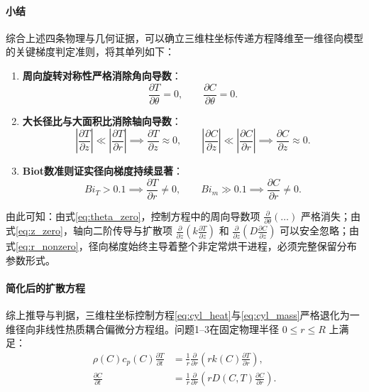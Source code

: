 \documentclass[12pt,a4paper]{ctexart}
\begin{document}
\paragraph{小结}
综合上述四条物理与几何证据，可以确立三维柱坐标传递方程降维至一维径向模型的关键梯度判定准则，将其单列如下：
\begin{enumerate}[label=(\arabic*)]
  \item \textbf{周向旋转对称性严格消除角向导数}：
  \begin{equation}
  \frac{\partial T}{\partial\theta} = 0,\qquad \frac{\partial C}{\partial\theta} = 0.\label{eq:theta_zero}
  \end{equation}
  \item \textbf{大长径比与大面积比消除轴向导数}：
  \begin{equation}
  \left|\frac{\partial T}{\partial z}\right|\ll\left|\frac{\partial T}{\partial r}\right| \implies \frac{\partial T}{\partial z} \approx 0,\qquad
  \left|\frac{\partial C}{\partial z}\right|\ll\left|\frac{\partial C}{\partial r}\right| \implies \frac{\partial C}{\partial z} \approx 0.\label{eq:z_zero}
  \end{equation}
  \item \textbf{Biot数准则证实径向梯度持续显著}：
  \begin{equation}
  Bi_T > 0.1 \implies \frac{\partial T}{\partial r} \neq 0,\qquad
  Bi_m \gg 0.1 \implies \frac{\partial C}{\partial r} \neq 0.\label{eq:r_nonzero}
  \end{equation}
\end{enumerate}
由此可知：由式\eqref{eq:theta_zero}，控制方程中的周向导数项 $\frac{\partial}{\partial\theta}(\dots)$ 严格消失；由式\eqref{eq:z_zero}，轴向二阶传导与扩散项 $\frac{\partial}{\partial z}\left(k\frac{\partial T}{\partial z}\right)$ 和 $\frac{\partial}{\partial z}\left(D\frac{\partial C}{\partial z}\right)$ 可以安全忽略；由式\eqref{eq:r_nonzero}，径向梯度始终主导着整个非定常烘干进程，必须完整保留分布参数形式。

\paragraph{简化后的扩散方程}
综上推导与判据，三维柱坐标控制方程\eqref{eq:cyl_heat}与\eqref{eq:cyl_mass}严格退化为一维径向非线性热质耦合偏微分方程组。问题1--3在固定物理半径 $0\le r\le R$ 上满足：
\begin{align}
\rho(C)c_p(C)\frac{\partial T}{\partial t}
&=\frac1r\frac{\partial}{\partial r}\left(rk(C)\frac{\partial T}{\partial r}\right),\label{eq:heat}\\[10pt]
\frac{\partial C}{\partial t}
&=\frac1r\frac{\partial}{\partial r}\left(rD(C,T)\frac{\partial C}{\partial r}\right).\label{eq:mass}
\end{align}
\end{document}
